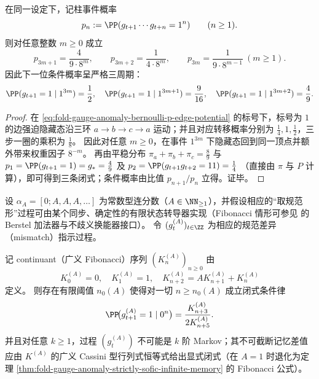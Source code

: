 \begin{proposition}\label{prop:fold-gauge-anomaly-one-block-three-period-law}
在同一设定下，记柱事件概率
\[
p_n:=\PP(g_{t+1}\cdots g_{t+n}=1^n)\qquad(n\ge 1).
\]
则对任意整数 \(m\ge 0\) 成立
\[
p_{3m+1}=\frac{4}{9\cdot 8^{m}},\qquad
p_{3m+2}=\frac{1}{4\cdot 8^{m}},\qquad
p_{3m}=\frac{1}{9\cdot 8^{m-1}}\ (m\ge 1).
\]
因此下一位条件概率呈严格三周期：
\[
\PP(g_{t+1}=1\mid 1^{3m})=\frac12,\quad
\PP(g_{t+1}=1\mid 1^{3m+1})=\frac{9}{16},\quad
\PP(g_{t+1}=1\mid 1^{3m+2})=\frac{4}{9}.
\]
\end{proposition}
\begin{proof}
在 \eqref{eq:fold-gauge-anomaly-bernoulli-p-edge-potential} 的标号下，标号为 \(1\) 的边强迫隐藏态沿三环
\(
a\to b\to c\to a
\)
运动；并且对应转移概率分别为 \(\frac14,1,\frac12\)，三步一圈的乘积为 \(\frac18\)。
因此对任意 \(m\ge 0\)，在事件 \(1^{3m}\) 下隐藏态回到同一顶点并额外带来权重因子 \(8^{-m}\)。
再由平稳分布 \(\pi_a+\pi_b+\pi_c=\frac89\) 与
\(
p_1=\PP(g_{t+1}=1)=g_\ast=\frac49
\)
及
\(
p_2=\PP(g_{t+1}g_{t+2}=11)=\frac14
\)
（直接由 \(\pi\) 与 \(P\) 计算），即可得到三条闭式；条件概率由比值 \(p_{n+1}/p_n\) 立得。证毕。
\end{proof}

\begin{conjecture}\label{conj:fold-gauge-anomaly-metallic-continuant-law}
设 \(\alpha_A=[0;A,A,A,\dots]\) 为常数型连分数（\(A\in\NN_{\ge 1}\)），并假设相应的“取规范形”过程可由某个同步、确定性的有限状态转导器实现（Fibonacci 情形可参见 \cite{ITA_2001__35_6_491_0,LabbeLepsova2023FibonacciTwosComplement} 的 Berstel 加法器与不歧义换能器接口）。
令 \((g^{(A)}_t)_{t\in\ZZ}\) 为相应的规范差异（mismatch）指示过程。
\par
记 continuant（广义 Fibonacci）序列 \((K^{(A)}_n)_{n\ge 0}\) 由
\[
K^{(A)}_0=0,\quad K^{(A)}_1=1,\quad K^{(A)}_{n+2}=A K^{(A)}_{n+1}+K^{(A)}_{n}
\]
定义。
则存在有限阈值 \(n_0(A)\) 使得对一切 \(n\ge n_0(A)\) 成立闭式条件律
\[
\PP\!\bigl(g^{(A)}_{t+1}=1\mid 0^n\bigr)=\frac{K^{(A)}_{n+3}}{2K^{(A)}_{n+5}}.
\]
并且对任意 \(k\ge 1\)，过程 \((g^{(A)}_t)\) 不可能是 \(k\) 阶 Markov；其不可截断记忆差值应由 \(K^{(A)}\) 的广义 Cassini 型行列式恒等式给出显式闭式（在 \(A=1\) 时退化为定理 \ref{thm:fold-gauge-anomaly-strictly-sofic-infinite-memory} 的 Fibonacci 公式）。
\end{conjecture}

\endinput

